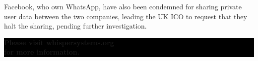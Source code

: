 \documentclass[10.5pt,a4paper]{article} %
\begin{document}
\begin{multicols*}{2}
Facebook, who own WhatsApp, have also been condemned for sharing private user data between the two companies, leading the UK ICO to request that they halt the sharing, pending further investigation.


\begin{center}
	\vfill %
	\colorbox{Black}{
		\begin{minipage}{8cm}
			\color{white}
			\vspace{0.2cm}
			\begin{center}
				\textbf{{\Large Please visit \url{whispersystems.org}\\for more information.}}
			\end{center}
			\vspace{0.2cm}
		\end{minipage}
	}
\end{center}

\vspace{0.75cm}

\end{multicols*}
\end{document}
